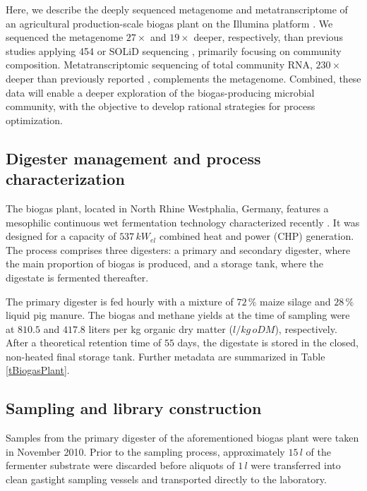 \documentclass{bmcart}
\begin{document}
Here, we describe the deeply sequenced metagenome and metatranscriptome of an agricultural production-scale biogas plant on the Illumina platform \cite{GigaDB}.
We sequenced the metagenome $27 \times$ and $19 \times$ deeper, respectively, than previous studies applying 454 or SOLiD sequencing \cite{Jaenicke2011, Wirth2012}, primarily focusing on community composition.
Metatranscriptomic sequencing of total community RNA, $230 \times$ deeper than previously reported \cite{Zakrzewski2012}, complements the metagenome.
Combined, these data will enable a deeper exploration of the biogas-producing microbial community, with the objective to develop rational strategies for process optimization.


\subsection*{Digester management and process characterization}
The biogas plant, located in North Rhine Westphalia, Germany, features a mesophilic continuous wet fermentation technology characterized recently \cite{Stolze2015}.
It was designed for a capacity of $537\,kW_{el}$ combined heat and power (CHP) generation.
The process comprises three digesters: a primary and secondary digester, where the main proportion of biogas is produced, and a storage tank, where the digestate is fermented thereafter.

The primary digester is fed hourly with a mixture of $72\,\%$ maize silage and $28\,\%$ liquid pig manure.
The biogas and methane yields at the time of sampling were at $810.5$ and $417.8$ liters per kg organic dry matter ($l / kg\,oDM$), respectively.
After a theoretical retention time of $55$ days, the digestate is stored in the closed, non-heated final storage tank.
Further metadata are summarized in Table \ref{tBiogasPlant}.

\subsection*{Sampling and library construction}
Samples from the primary digester of the aforementioned biogas plant were taken in November 2010.
Prior to the sampling process, approximately $15\,l$ of the fermenter substrate were discarded before aliquots of $1\,l$ were transferred into clean gastight sampling vessels and transported directly to the laboratory.
\end{document}
